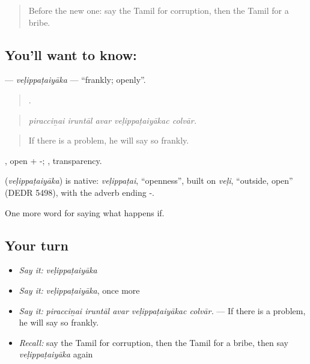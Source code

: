 \label{lesson:TA-C392-velippataiyaka}



\begin{quote}
Before the new one: say the Tamil for corruption, then the Tamil for a bribe.
\end{quote}

\subsection*{You'll want to know: }
\textbf{} — \emph{veḷippaṭaiyāka} — \textquotedblleft{}frankly; openly\textquotedblright{}.

\begin{quote}
    .
\end{quote}

\begin{quote}
\emph{piracciṉai iruntāl avar veḷippaṭaiyākac colvār.}
\end{quote}

\begin{quote}
If there is a problem, he will say so frankly.
\end{quote}

, open + -; , transparency.

\begin{cousinweb}
\textbf{} (\emph{veḷippaṭaiyāka}) is native: \emph{veḷippaṭai}, \textquotedblleft{}openness\textquotedblright{}, built on \emph{veḷi}, \textquotedblleft{}outside, open\textquotedblright{} (DEDR 5498), with the adverb ending -.
\end{cousinweb}

\begin{grammarlens}[title={What you've built}]
One more word for saying what happens if.
\end{grammarlens}

\subsection*{Your turn}
\begin{itemize}
\raggedright
  \item \emph{Say it:} \emph{veḷippaṭaiyāka}
  \item \emph{Say it:} \emph{veḷippaṭaiyāka}, once more
  \item \emph{Say it:} \emph{piracciṉai iruntāl avar veḷippaṭaiyākac colvār.} — If there is a problem, he will say so frankly.
  \item \emph{Recall:} say the Tamil for corruption, then the Tamil for a bribe, then say \emph{veḷippaṭaiyāka} again
\end{itemize}

